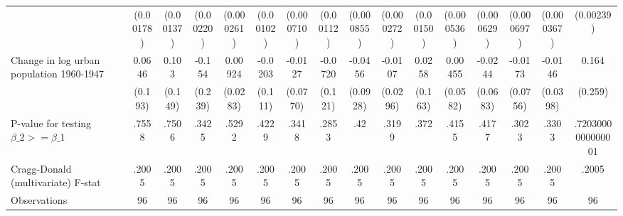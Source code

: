 {\begin{tabular}{l*{15}{c}}
                &(0.00178)         &(0.00137)         &(0.00220)         &(0.000261)         &(0.00102)         &(0.000710)         &(0.00112)         &(0.000855)         &(0.000272)         &(0.00150)         &(0.000536)         &(0.000629)         &(0.000697)         &(0.000367)         &(0.00239)         \\
[1em]
Change in log urban population 1960-1947&   0.0646         &    0.103         &   -0.154         &  0.00924         &  -0.0203         &  -0.0127         &  -0.0720         &  -0.0456         &  -0.0107         &   0.0258         &  0.00455         &  -0.0244         &  -0.0173         &  -0.0146         &    0.164         \\
                &  (0.193)         &  (0.149)         &  (0.239)         & (0.0283)         &  (0.111)         & (0.0770)         &  (0.121)         & (0.0928)         & (0.0296)         &  (0.163)         & (0.0582)         & (0.0683)         & (0.0756)         & (0.0398)         &  (0.259)         \\
\hline
P-value for testing $\beta\_{2} >= \beta\_{1}$&    .7558         &    .7506         &    .3425         &    .5292         &    .4229         &    .3418         &    .2853         &      .42         &    .3199         &     .372         &    .4155         &    .4177         &    .3023         &    .3303         &.7203000000000001         \\
Cragg-Donald (multivariate) F-stat&    .2005         &    .2005         &    .2005         &    .2005         &    .2005         &    .2005         &    .2005         &    .2005         &    .2005         &    .2005         &    .2005         &    .2005         &    .2005         &    .2005         &    .2005         \\
Observations    &       96         &       96         &       96         &       96         &       96         &       96         &       96         &       96         &       96         &       96         &       96         &       96         &       96         &       96         &       96         \\
\hline\hline
\end{tabular}
}
